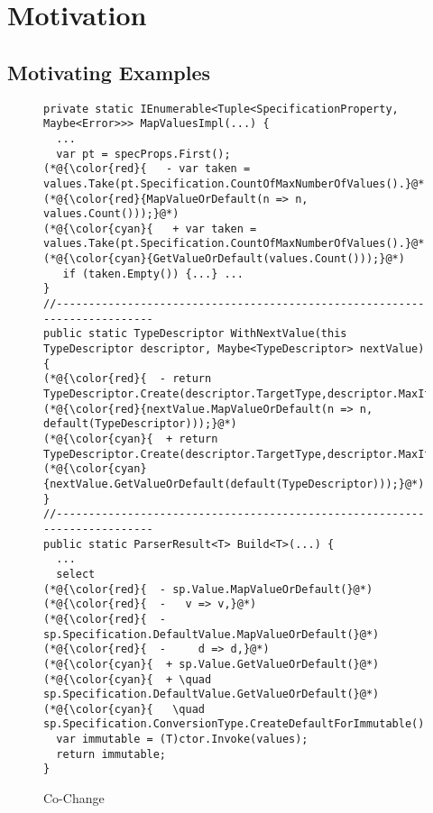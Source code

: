 \section{Motivation}
\label{motiv:sec}

\subsection{Motivating Examples}
\label{exe:sec}



\begin{figure}[t]
	\centering
	\begin{lstlisting}[]
private static IEnumerable<Tuple<SpecificationProperty, Maybe<Error>>> MapValuesImpl(...) {
  ...
  var pt = specProps.First();
(*@{\color{red}{   - var taken = values.Take(pt.Specification.CountOfMaxNumberOfValues().}@*) (*@{\color{red}{MapValueOrDefault(n => n, values.Count()));}@*)
(*@{\color{cyan}{   + var taken = values.Take(pt.Specification.CountOfMaxNumberOfValues().}@*) (*@{\color{cyan}{GetValueOrDefault(values.Count()));}@*)
   if (taken.Empty()) {...} ...
}
//--------------------------------------------------------------------------
public static TypeDescriptor WithNextValue(this TypeDescriptor descriptor, Maybe<TypeDescriptor> nextValue) {
(*@{\color{red}{  - return TypeDescriptor.Create(descriptor.TargetType,descriptor.MaxItems,}@*) (*@{\color{red}{nextValue.MapValueOrDefault(n => n, default(TypeDescriptor)));}@*)
(*@{\color{cyan}{  + return TypeDescriptor.Create(descriptor.TargetType,descriptor.MaxItems,}@*) (*@{\color{cyan}{nextValue.GetValueOrDefault(default(TypeDescriptor)));}@*)
}
//--------------------------------------------------------------------------
public static ParserResult<T> Build<T>(...) {
  ...
  select
(*@{\color{red}{  - sp.Value.MapValueOrDefault(}@*)
(*@{\color{red}{  -   v => v,}@*)
(*@{\color{red}{  -   sp.Specification.DefaultValue.MapValueOrDefault(}@*)
(*@{\color{red}{  -     d => d,}@*)
(*@{\color{cyan}{  + sp.Value.GetValueOrDefault(}@*)
(*@{\color{cyan}{  + \quad sp.Specification.DefaultValue.GetValueOrDefault(}@*)
(*@{\color{cyan}{   \quad  sp.Specification.ConversionType.CreateDefaultForImmutable()))).ToArray();}@*)
  var immutable = (T)ctor.Invoke(values);
  return immutable;
}
	\end{lstlisting}
        \vspace{-15pt}
        \caption{Co-Change}
        \vspace{-6pt}
        \label{fig:motiv-cc}
\end{figure}



